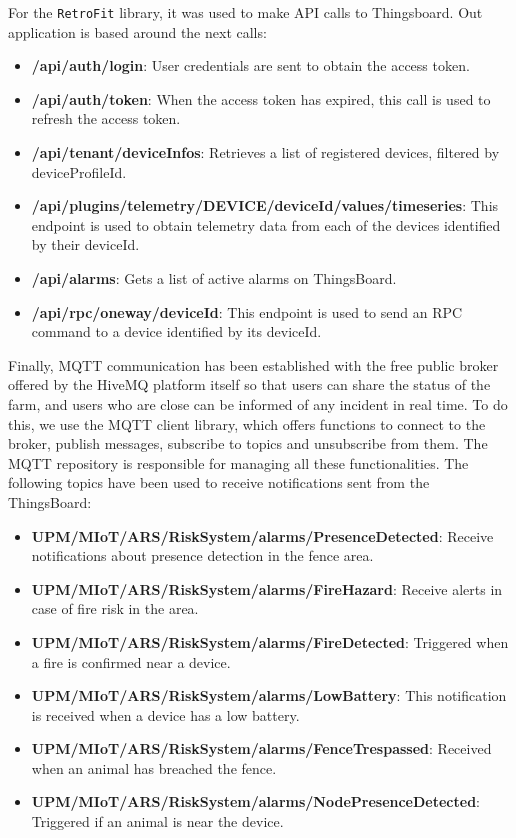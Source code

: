 For the \texttt{RetroFit} library, it was used to make API calls to Thingsboard. Out application is based around the next calls:
\begin{itemize}
    \item \textbf{/api/auth/login}: User credentials are sent to obtain the access token.
    \item \textbf{/api/auth/token}: When the access token has expired, this call is used to refresh the access token.
    \item \textbf{/api/tenant/deviceInfos}: Retrieves a list of registered devices, filtered by deviceProfileId. 
    \item \textbf{/api/plugins/telemetry/DEVICE/{deviceId}/values/timeseries}: This endpoint is used to obtain telemetry data from each of the devices identified by their deviceId.
    \item \textbf{/api/alarms}: Gets a list of active alarms on ThingsBoard. 
    \item \textbf{/api/rpc/oneway/{deviceId}}: This endpoint is used to send an RPC command to a device identified by its deviceId.
\end{itemize}

\clearpage
Finally, MQTT communication has been established with the free public broker offered by the HiveMQ platform itself so that users can share the status of the farm, 
and users who are close can be informed of any incident in real time.
To do this, we use the MQTT client library, which offers functions to connect to the broker, publish messages, subscribe to topics and unsubscribe from them.
The MQTT repository is responsible for managing all these functionalities. The following topics have been used to receive notifications sent from the ThingsBoard:

\begin{itemize}
    \item \textbf{UPM/MIoT/ARS/RiskSystem/alarms/PresenceDetected}: Receive notifications about presence detection in the fence area.
    \item \textbf{UPM/MIoT/ARS/RiskSystem/alarms/FireHazard}: Receive alerts in case of fire risk in the area.
    \item \textbf{UPM/MIoT/ARS/RiskSystem/alarms/FireDetected}: Triggered when a fire is confirmed near a device.
    \item \textbf{UPM/MIoT/ARS/RiskSystem/alarms/LowBattery}: This notification is received when a device has a low battery.
    \item \textbf{UPM/MIoT/ARS/RiskSystem/alarms/FenceTrespassed}: Received when an animal has breached the fence.
    \item \textbf{UPM/MIoT/ARS/RiskSystem/alarms/NodePresenceDetected}: Triggered if an animal is near the device.
\end{itemize}
\clearpage
